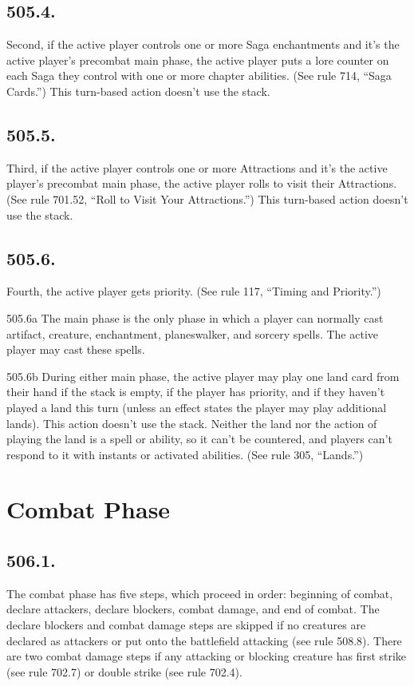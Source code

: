 \subsection*{505.4.}
Second, if the active player controls one or more Saga enchantments and it’s the active player’s precombat main phase, the active player puts a lore counter on each Saga they control with one or more chapter abilities. (See rule 714, “Saga Cards.”) This turn-based action doesn’t use the stack.

\subsection*{505.5.}
Third, if the active player controls one or more Attractions and it’s the active player’s precombat main phase, the active player rolls to visit their Attractions. (See rule 701.52, “Roll to Visit Your Attractions.”) This turn-based action doesn’t use the stack.

\subsection*{505.6.}
Fourth, the active player gets priority. (See rule 117, “Timing and Priority.”)

505.6a The main phase is the only phase in which a player can normally cast artifact, creature, enchantment, planeswalker, and sorcery spells. The active player may cast these spells.

505.6b During either main phase, the active player may play one land card from their hand if the stack is empty, if the player has priority, and if they haven’t played a land this turn (unless an effect states the player may play additional lands). This action doesn’t use the stack. Neither the land nor the action of playing the land is a spell or ability, so it can’t be countered, and players can’t respond to it with instants or activated abilities. (See rule 305, “Lands.”)

\section{Combat Phase}
\subsection*{506.1.}
The combat phase has five steps, which proceed in order: beginning of combat, declare attackers, declare blockers, combat damage, and end of combat. The declare blockers and combat damage steps are skipped if no creatures are declared as attackers or put onto the battlefield attacking (see rule 508.8). There are two combat damage steps if any attacking or blocking creature has first strike (see rule 702.7) or double strike (see rule 702.4).

